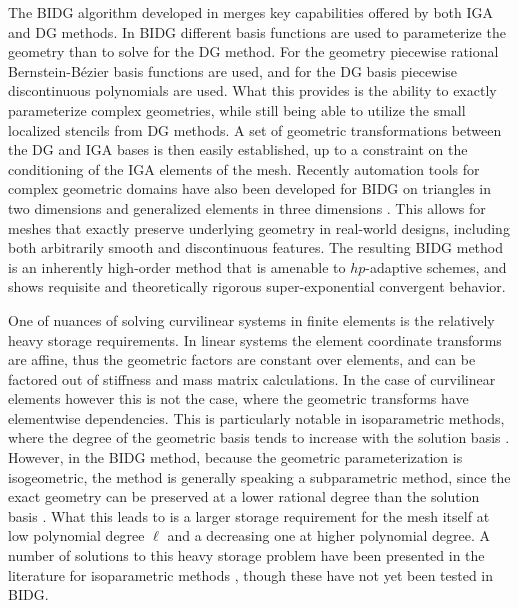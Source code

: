 The BIDG algorithm developed in \cite{Michoski2016658} merges key capabilities
offered by both IGA and DG methods.  In BIDG different basis functions are used to parameterize the geometry than to solve for the DG method.  For the geometry piecewise rational Bernstein-B\'{e}zier basis functions are used, and for the DG basis piecewise discontinuous polynomials are used.  What this provides is the ability to exactly parameterize complex geometries, while still being able to utilize the small localized stencils from DG methods.   A set of geometric transformations between the DG and IGA bases is then easily established, up to a constraint on the conditioning of the IGA elements of the mesh. 
Recently automation tools for complex geometric domains have also been developed for BIDG on triangles in two dimensions \cite{Engvall2016378} and generalized elements in three dimensions \cite{EngvallPress}.  This allows for meshes that exactly
preserve underlying geometry in real-world designs, including both arbitrarily
smooth and discontinuous features. The resulting BIDG method is an inherently high-order method that is amenable to $hp$-adaptive schemes, and shows requisite and theoretically rigorous super-exponential convergent behavior.


One of nuances of solving curvilinear systems in finite elements is the relatively heavy storage requirements.  In linear systems the element coordinate transforms are affine, thus the geometric factors are constant over elements, and can be factored out of stiffness and mass matrix calculations.  In the case of curvilinear elements however this is not the case, where the geometric transforms have elementwise dependencies.  This is particularly notable in isoparametric methods, where the degree of the geometric basis tends to increase with the solution basis \cite{doi:10.1137/120899662}.  However, in the BIDG method, because the geometric parameterization is isogeometric, the method is generally speaking a subparametric method, since the exact geometry can be preserved at a lower rational degree than the solution basis  \cite{Michoski2016658}.  What this leads to is a larger storage requirement for the mesh itself at low polynomial degree $\ell$ and a decreasing one at higher polynomial degree.  A number of solutions to this heavy storage problem have been presented in the literature for isoparametric methods \cite{doi:10.1137/120899662}, though these have not yet been tested in BIDG.



